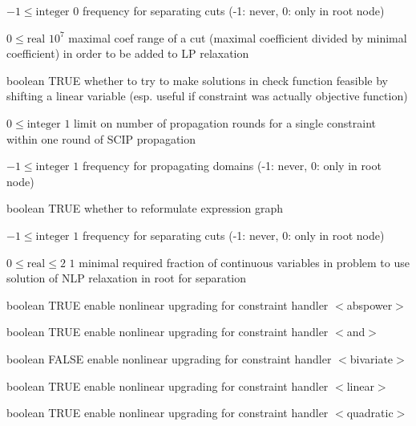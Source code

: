 %
{$-1\leq\textrm{integer}$}%
{$0$}%
{frequency for separating cuts (-1: never, 0: only in root node)}%
{}

%
{$0\leq\textrm{real}$}%
{$10^{  7}$}%
{maximal coef range of a cut (maximal coefficient divided by minimal coefficient) in order to be added to LP relaxation}%
{}

%
{boolean}%
{TRUE}%
{whether to try to make solutions in check function feasible by shifting a linear variable (esp. useful if constraint was actually objective function)}%
{}

%
{$0\leq\textrm{integer}$}%
{$1$}%
{limit on number of propagation rounds for a single constraint within one round of SCIP propagation}%
{}

%
{$-1\leq\textrm{integer}$}%
{$1$}%
{frequency for propagating domains (-1: never, 0: only in root node)}%
{}

%
{boolean}%
{TRUE}%
{whether to reformulate expression graph}%
{}

%
{$-1\leq\textrm{integer}$}%
{$1$}%
{frequency for separating cuts (-1: never, 0: only in root node)}%
{}

%
{$0\leq\textrm{real}\leq2$}%
{$1$}%
{minimal required fraction of continuous variables in problem to use solution of NLP relaxation in root for separation}%
{}

%
{boolean}%
{TRUE}%
{enable nonlinear upgrading for constraint handler $<$abspower$>$}%
{}

%
{boolean}%
{TRUE}%
{enable nonlinear upgrading for constraint handler $<$and$>$}%
{}

%
{boolean}%
{FALSE}%
{enable nonlinear upgrading for constraint handler $<$bivariate$>$}%
{}

%
{boolean}%
{TRUE}%
{enable nonlinear upgrading for constraint handler $<$linear$>$}%
{}

%
{boolean}%
{TRUE}%
{enable nonlinear upgrading for constraint handler $<$quadratic$>$}%
{}

